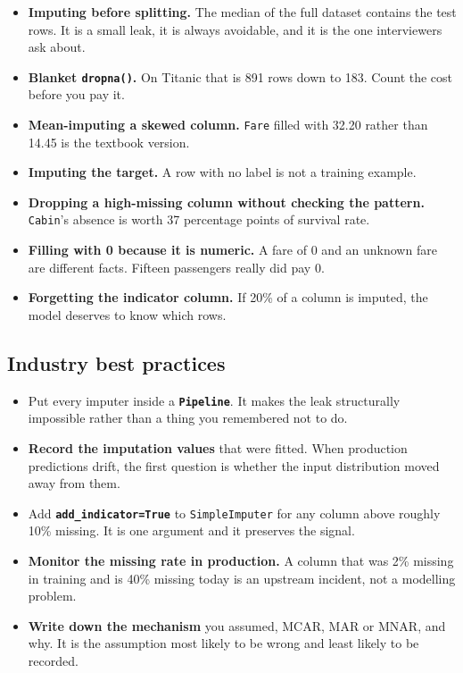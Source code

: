 \documentclass[11pt,a4paper]{article}
\begin{document}
\begin{itemize}\itemsep3pt
  \item \textbf{Imputing before splitting.} The median of the full dataset contains the test
        rows. It is a small leak, it is always avoidable, and it is the one interviewers ask
        about.
  \item \textbf{Blanket \lstinline|dropna()|.} On Titanic that is 891 rows down to 183.
        Count the cost before you pay it.
  \item \textbf{Mean-imputing a skewed column.} \texttt{Fare} filled with 32.20 rather than
        14.45 is the textbook version.
  \item \textbf{Imputing the target.} A row with no label is not a training example.
  \item \textbf{Dropping a high-missing column without checking the pattern.}
        \texttt{Cabin}'s absence is worth 37 percentage points of survival rate.
  \item \textbf{Filling with 0 because it is numeric.} A fare of 0 and an unknown fare are
        different facts. Fifteen passengers really did pay 0.
  \item \textbf{Forgetting the indicator column.} If 20\% of a column is imputed, the model
        deserves to know which rows.
\end{itemize}

\subsection*{Industry best practices}

\begin{itemize}\itemsep3pt
  \item Put every imputer inside a \textbf{\lstinline|Pipeline|}. It makes the leak
        structurally impossible rather than a thing you remembered not to do.
  \item \textbf{Record the imputation values} that were fitted. When production predictions
        drift, the first question is whether the input distribution moved away from them.
  \item Add \textbf{\lstinline|add_indicator=True|} to \lstinline|SimpleImputer| for any
        column above roughly 10\% missing. It is one argument and it preserves the signal.
  \item \textbf{Monitor the missing rate in production.} A column that was 2\% missing in
        training and is 40\% missing today is an upstream incident, not a modelling problem.
  \item \textbf{Write down the mechanism} you assumed, MCAR, MAR or MNAR, and why. It is
        the assumption most likely to be wrong and least likely to be recorded.
\end{itemize}
\end{document}
